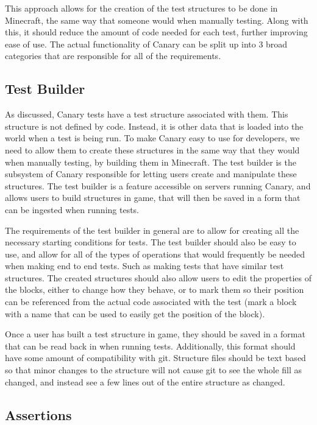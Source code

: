 \documentclass{article}
\begin{document}
\begin{doublespacing}
This approach allows for the creation of the test structures to be done in Minecraft, the same way that someone would when manually testing. Along with this, it should reduce the amount of code needed for each test, further improving ease of use. The actual functionality of Canary can be split up into 3 broad categories that are responsible for all of the requirements.

\subsection{Test Builder}
As discussed, Canary tests have a test structure associated with them. This structure is not defined by code. Instead, it is other data that is loaded into the world when a test is being run. To make Canary easy to use for developers, we need to allow them to create these structures in the same way that they would when manually testing, by building them in Minecraft. The test builder is the subsystem of Canary responsible for letting users create and manipulate these structures. The test builder is a feature accessible on servers running Canary, and allows users to build structures in game, that will then be saved in a form that can be ingested when running tests.  

The requirements of the test builder in general are to allow for creating all the necessary starting conditions for tests. The test builder should also be easy to use, and allow for all of the types of operations that would frequently be needed when making end to end tests. Such as making tests that have similar test structures. The created structures should also allow users to edit the properties of the blocks, either to change how they behave, or to mark them so their position can be referenced from the actual code associated with the test (mark a block with a name that can be used to easily get the position of the block).

Once a user has built a test structure in game, they should be saved in a format that can be read back in when running tests. Additionally, this format should have some amount of compatibility with git. Structure files should be text based so that minor changes to the structure will not cause git to see the whole fill as changed, and instead see a few lines out of the entire structure as changed. 
\subsection{Assertions}


\end{doublespacing}
\end{document}
